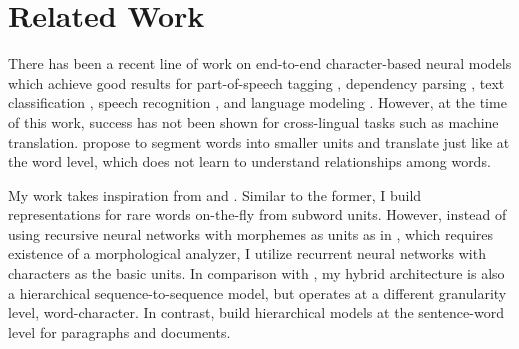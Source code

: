 \section{Related Work}
There has been a recent line of work on end-to-end character-based neural models
which achieve good results for part-of-speech tagging \cite{santos14,ling15function},
dependency parsing \cite{ballesteros15}, text classification
\cite{zhang15}, speech recognition \cite{chan16,bahdanau16}, and language
modeling \cite{kim16,rafal16}. However, at the time of this work, success has not been shown for
cross-lingual tasks such as machine translation.
 propose to segment words into smaller units and
translate just like at the word level, which does not learn to understand
relationships among words.

My work takes inspiration from \cite{luong13} and 
\cite{li15}. Similar to the former, I build representations for rare words
on-the-fly from subword units. However, instead of using recursive neural
networks with morphemes as units as in \cite{luong13}, which requires existence of a
morphological analyzer, I utilize recurrent neural networks
with characters as the basic units. In comparison with \cite{li15}, my hybrid architecture
is also a hierarchical sequence-to-sequence model, but operates at a different
granularity level, word-character. In contrast,  build
hierarchical models at the sentence-word level for paragraphs and documents.

